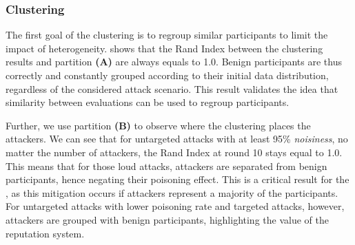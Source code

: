 \subsubsection{Clustering\label{sec:eval.results.cluster}}
The first goal of the clustering is to regroup similar participants to limit the impact of heterogeneity. 
 shows that the Rand Index between the clustering results and partition \textbf{(A)} are always equals to 1.0. 
Benign participants are thus correctly and constantly grouped according to their initial data distribution, regardless of the considered attack scenario.  
This result validates the idea that similarity between evaluations can be used to regroup participants. 

Further, we use partition \textbf{(B)} to observe where the clustering places the attackers.
We can see that for untargeted attacks with at least 95\% \emph{noisiness}, no matter the number of attackers, the Rand Index at round 10 stays equal to 1.0. 
This means that for those loud attacks, attackers are separated from benign participants, hence negating their poisoning effect.
This is a critical result for the \thecontrib, as this mitigation occurs if attackers represent a majority of the participants.
For untargeted attacks with lower poisoning rate and targeted attacks, however, attackers are grouped with benign participants, highlighting the value of the reputation system. 




  
